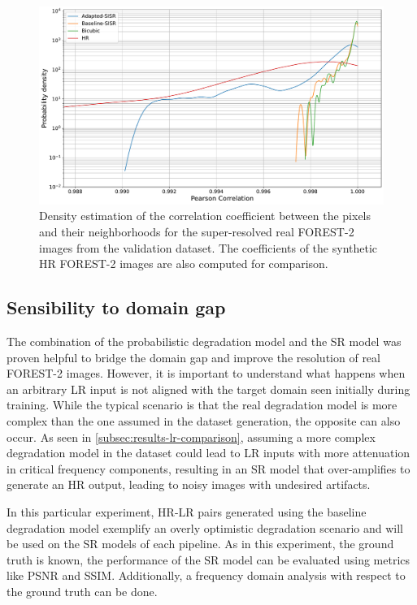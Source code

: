         \begin{figure}[H]
            \centering
            \includegraphics[scale=0.35]{Includes/5-correlation-histogram-validation-dataset.pdf}
            \caption{Density estimation of the correlation coefficient between the pixels and their neighborhoods for the super-resolved real FOREST-2 images from the validation dataset. The coefficients of the synthetic HR FOREST-2 images are also computed for comparison.}
            \label{fig:5-correlation-histogram-validation-dataset}
        \end{figure}

    \subsection{Sensibility to domain gap}
    
        The combination of the probabilistic degradation model and the SR model was proven helpful to bridge the domain gap and improve the resolution of real FOREST-2 images.
        However, it is important to understand what happens when an arbitrary LR input is not aligned with the target domain seen initially during training.
        While the typical scenario is that the real degradation model is more complex than the one assumed in the dataset generation, the opposite can also occur.
        As seen in \ref{subsec:results-lr-comparison}, assuming a more complex degradation model in the dataset could lead to LR inputs with more attenuation in critical frequency components, resulting in an SR model that over-amplifies to generate an HR output, leading to noisy images with undesired artifacts.
        
        In this particular experiment, HR-LR pairs generated using the baseline degradation model exemplify an overly optimistic degradation scenario and will be used on the SR models of each pipeline.
        As in this experiment, the ground truth is known, the performance of the SR model can be evaluated using metrics like PSNR and SSIM. Additionally, a frequency domain analysis with respect to the ground truth can be done.
        
